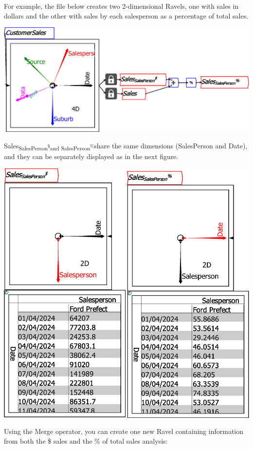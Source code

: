 For example, the file below creates two 2-dimensional Ravels, one
with sales in dollars and the other with sales by each salesperson
as a percentage of total sales.

\noindent\includegraphics[width=\textwidth]{images/MergeExample01TwoVariables}

Sales\textsubscript{SalesPerson\textsuperscript{\$}and SalesPerson\textsuperscript{\%}}share
the same dimensions (SalesPerson and Date), and they can be separately
displayed as in the next figure.

\noindent\includegraphics[width=\textwidth]{images/MergeExample02TwoVariablesSeparate}

Using the Merge operator, you can create one new Ravel containing
information from both the \$ sales and the \% of total sales analysis:

